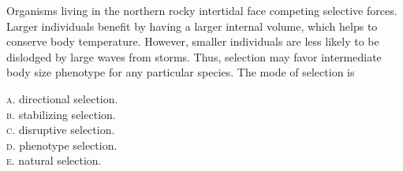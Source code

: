 \documentclass[letterpaper]{tufte-handout}
\begin{document}
\bigskip

\noindent Organisms living in the northern rocky intertidal face competing selective forces. Larger individuals benefit by having a larger internal volume, which helps to conserve body temperature. However, smaller individuals are less likely to be dislodged by large waves from storms. Thus, selection may favor intermediate body size phenotype for any particular species. The mode of selection is

\smallskip

\textsc{a}. directional selection.\\
\textsc{b}. stabilizing selection. \\
\textsc{c}. disruptive selection. \\
\textsc{d}. phenotype selection. \\
\textsc{e}. natural selection.





\bigskip
\end{document}
